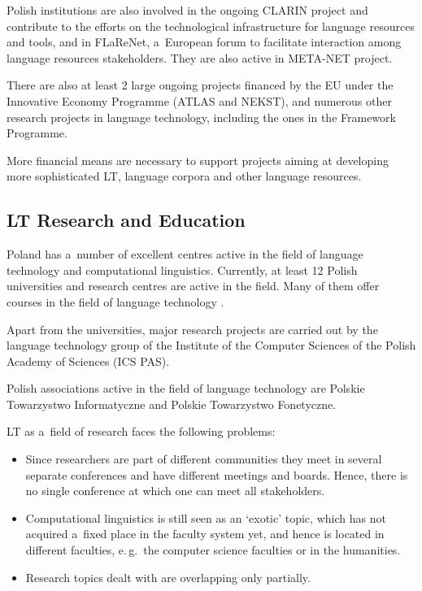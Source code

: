 \begin{multicols}{2}
Polish institutions are also involved in the ongoing CLARIN project
and contribute to the efforts on the technological infrastructure for
language resources and tools, and in FLaReNet, a~European forum to
facilitate interaction among language resources stakeholders. They are
also active in META-NET project. 

There are also at least 2 large ongoing projects financed by the EU
under the Innovative Economy Programme (ATLAS and NEKST), and numerous
other research projects in language technology, including the ones in
the Framework Programme. 

More financial means are necessary to support projects aiming at
developing more sophisticated LT, language corpora and other language
resources. 

\subsection[LT Research and Education]{LT Research and Education} 

Poland has a~number of excellent centres active in the field of
language technology and computational linguistics. Currently, at least
12 Polish universities and research centres are active in the field.
Many of them offer courses in the field of language technology
\cite{centers1}. 

Apart from the universities, major research projects are carried out
by the language technology group of the Institute of the Computer
Sciences of the Polish Academy of Sciences (ICS PAS). 

Polish associations active in the field of language technology are
Polskie Towarzystwo Informatyczne and Polskie Towarzystwo Fonetyczne. 

LT as a~field of research faces the following problems: 

\begin{itemize} \item Since researchers are part of different
communities they meet in several separate conferences and have
different meetings and boards. Hence, there is no single conference at
which one can meet all stakeholders. \item Computational linguistics
is still seen as an ‘exotic’ topic, which has not acquired a~fixed
place in the faculty system yet, and hence is located in different
faculties, e.\,g.~the computer science faculties or in the humanities.
\item Research topics dealt with are overlapping only partially.
\end{itemize} 


\end{multicols}
